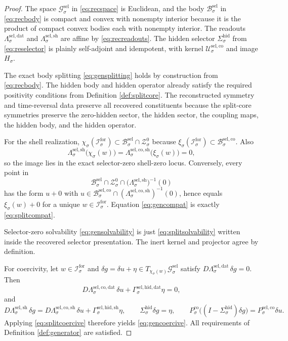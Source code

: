 \documentclass[11pt]{article}
\newcommand{\ForSpace}[1]{\mathcal I_{#1}^{\mathrm{for}}}
\newcommand{\GenSpace}[1]{\mathcal G_{#1}^{\mathrm{sel}}}
\newcommand{\GenBody}[1]{\mathcal B_{#1}^{\mathrm{sel}}}
\newcommand{\GenData}[1]{\Lambda_{#1}^{\mathrm{sel,dat}}}
\newcommand{\GenShell}[1]{\Lambda_{#1}^{\mathrm{sel,sh}}}
\newcommand{\HiddenSel}[1]{\Sigma_{#1}^{\mathrm{hid}}}
\newcommand{\ZeroHiddenSlice}[1]{\mathcal Z_{#1}^{0}}
\newcommand{\GapSpace}[1]{H_{#1}}
\newcommand{\GenEmbed}[1]{\chi_{#1}}
\newcommand{\StateComp}[1]{P_{#1}^{\mathrm{co}}}
\newcommand{\SelCoreSpace}[1]{\mathcal U_{#1}^{\mathrm{sel,co}}}
\newcommand{\SelCoreBody}[1]{\mathcal B_{#1}^{\mathrm{sel,co}}}
\newcommand{\SelCoreData}[1]{\Lambda_{#1}^{\mathrm{sel,co,dat}}}
\newcommand{\SelCoreShell}[1]{\Lambda_{#1}^{\mathrm{sel,co,sh}}}
\newcommand{\SelHiddenData}[1]{\Gamma_{#1}^{\mathrm{sel,hid,dat}}}
\newcommand{\SelHiddenShell}[1]{\Gamma_{#1}^{\mathrm{sel,hid,sh}}}
\newcommand{\SelCoreEmbed}[1]{\xi_{#1}}
\newcommand{\SelCoreProj}[1]{P_{#1}^{\mathrm{sel,co}}}
\begin{document}
\begin{proof}
The space \(\GenSpace{\sigma}\) in \eqref{eq:recspace} is Euclidean, and the body \(\GenBody{\sigma}\) in \eqref{eq:recbody} is compact and convex with nonempty interior because it is the product of compact convex bodies each with nonempty interior. The readouts \(\GenData{\sigma}\) and \(\GenShell{\sigma}\) are affine by \eqref{eq:recreadouts}. The hidden selector \(\HiddenSel{\sigma}\) from \eqref{eq:reselector} is plainly self-adjoint and idempotent, with kernel \(\SelCoreSpace{\sigma}\) and image \(\GapSpace{\sigma}\).

The exact body splitting \eqref{eq:gensplitting} holds by construction from \eqref{eq:recbody}. The hidden body and hidden operator already satisfy the required positivity conditions from Definition \ref{def:splitcore}. The reconstructed symmetry and time-reversal data preserve all recovered constituents because the split-core symmetries preserve the zero-hidden sector, the hidden sector, the coupling maps, the hidden body, and the hidden operator.

For the shell realization, \(\GenEmbed{\sigma}(\ForSpace{\sigma})\subset\GenBody{\sigma}\cap\ZeroHiddenSlice{\sigma}\) because \(\SelCoreEmbed{\sigma}(\ForSpace{\sigma})\subset\SelCoreBody{\sigma}\). Also
\[
\GenShell{\sigma}\bigl(\GenEmbed{\sigma}(w)\bigr)
=
\SelCoreShell{\sigma}\bigl(\SelCoreEmbed{\sigma}(w)\bigr)
=
0,
\]
so the image lies in the exact selector-zero shell-zero locus. Conversely, every point in
\[
\GenBody{\sigma}\cap\ZeroHiddenSlice{\sigma}\cap
\bigl(\GenShell{\sigma}\bigr)^{-1}(0)
\]
has the form \(u+0\) with \(u\in\SelCoreBody{\sigma}\cap(\SelCoreShell{\sigma})^{-1}(0)\), hence equals \(\SelCoreEmbed{\sigma}(w)+0\) for a unique \(w\in\ForSpace{\sigma}\). Equation \eqref{eq:gencompat} is exactly \eqref{eq:splitcompat}.

Selector-zero solvability \eqref{eq:gensolvability} is just \eqref{eq:splitsolvability} written inside the recovered selector presentation. The inert kernel and projector agree by definition.

For coercivity, let \(w\in\ForSpace{\sigma}\) and \(\delta g=\delta u+\eta\in T_{\GenEmbed{\sigma}(w)}\GenSpace{\sigma}\) satisfy \(D\GenData{\sigma}\,\delta g=0\). Then
\[
D\SelCoreData{\sigma}\,\delta u+\SelHiddenData{\sigma}\eta=0,
\]
and
\[
D\GenShell{\sigma}\,\delta g
=
D\SelCoreShell{\sigma}\,\delta u+\SelHiddenShell{\sigma}\eta,
\qquad
\HiddenSel{\sigma}\delta g=\eta,
\qquad
\StateComp{\sigma}\bigl((I-\HiddenSel{\sigma})\delta g\bigr)
=
\SelCoreProj{\sigma}\delta u.
\]
Applying \eqref{eq:splitcoercive} therefore yields \eqref{eq:gencoercive}. All requirements of Definition \ref{def:generator} are satisfied.
\end{proof}
\end{document}
